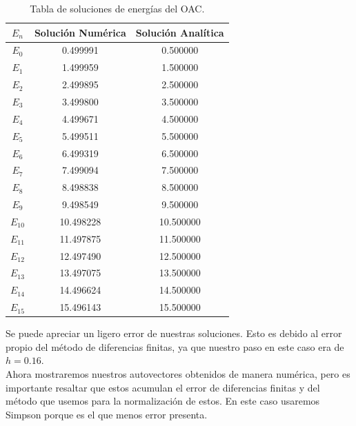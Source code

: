 \documentclass[12pt]{article}
\begin{document}
        \begin{table}[H]
            \centering
            \begin{tabular}{|c||c||c|}
            \hline
             $E_n$& Solución Numérica &Solución Analítica \\ [0.5ex] 
            \hline\hline
            $E_0$& 0.499991 & 0.500000 \\
            \hline
            $E_1$& 1.499959 & 1.500000 \\
            \hline
            $E_2$& 2.499895 &  2.500000\\
            \hline
            $E_3$& 3.499800  & 3.500000 \\
            \hline
            $E_4$& 4.499671 & 4.500000\\
            \hline
            $E_5$& 5.499511 & 5.500000 \\
            \hline
            $E_6$& 6.499319 & 6.500000 \\
            \hline
            $E_7$& 7.499094  & 7.500000 \\
            \hline
            $E_8$& 8.498838 & 8.500000 \\
            \hline
            $E_9$& 9.498549 & 9.500000 \\
            \hline
            $E_{10}$& 10.498228 & 10.500000 \\
            \hline
             $E_{11}$& 11.497875& 11.500000 \\
            \hline
            $E_{12}$& 12.497490 & 12.500000 \\
            \hline
            $E_{13}$& 13.497075 & 13.500000 \\
            \hline
            $E_{14}$& 14.496624 & 14.500000 \\
            \hline
            $E_{15}$& 15.496143 & 15.500000 \\
            \hline
            \end{tabular}
            \caption{Tabla de soluciones de energías del OAC.}
            \end{table}
            
    Se puede apreciar un ligero error de nuestras soluciones. Esto es debido al error propio del método de diferencias finitas, ya que nuestro paso en este caso era de $h=0.16$.\\
    
    Ahora mostraremos nuestros autovectores obtenidos de manera numérica, pero es importante resaltar que estos acumulan el error de diferencias finitas y del método que usemos para la normalización de estos. En este caso usaremos Simpson porque es el que menos error presenta.
    
\end{document}
